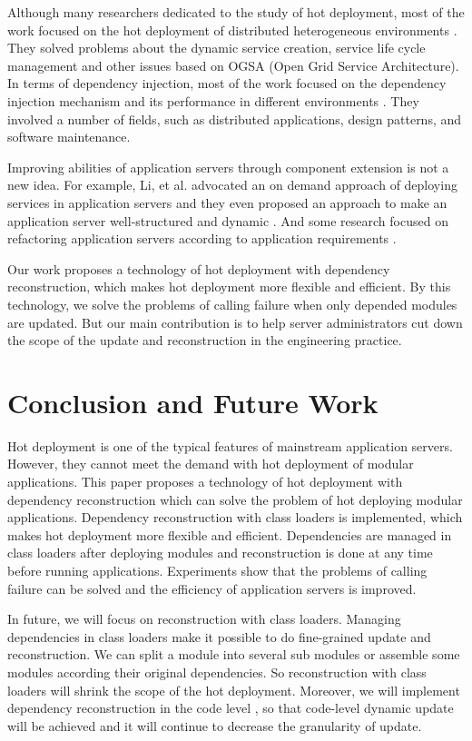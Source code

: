 \documentclass[conference]{IEEEtran}
\begin{document}
Although many researchers dedicated to the study of hot deployment, most of the work focused on the hot deployment of distributed heterogeneous environments \cite{related_hot_2, related_hot_3, related_hot_4}.
They solved problems about the dynamic service creation, service life cycle management and other issues based on OGSA (Open Grid Service Architecture).
In terms of dependency injection, most of the work focused on the dependency injection mechanism and its performance in different environments \cite{related_DI_1, related_DI_2}.
They involved a number of fields, such as distributed applications, design patterns, and software maintenance.

Improving abilities of application servers through component extension is not a new idea.
For example, Li, et al. advocated an on demand approach of deploying services in application servers \cite{related_AS_1} and they even proposed an approach to make an application server well-structured and dynamic \cite{related_AS_2}.
And some research focused on refactoring application servers according to application requirements \cite{related_AS_3}.

Our work proposes a technology of hot deployment with dependency reconstruction, which makes hot deployment more flexible and efficient.
By this technology, we solve the problems of calling failure when only depended modules are updated. 
But our main contribution is to help server administrators cut down the scope of the update and reconstruction in the engineering practice.


\section{Conclusion and Future Work\label{sec:conclusion}}
Hot deployment is one of the typical features of mainstream application servers.
However, they cannot meet the demand with hot deployment of modular applications.
This paper proposes a technology of hot deployment with dependency reconstruction which can solve the problem of hot deploying modular applications.
Dependency reconstruction with class loaders is implemented, which makes hot deployment more flexible and efficient.
Dependencies are managed in class loaders after deploying modules and reconstruction is done at any time before running applications. 
Experiments show that the problems of calling failure can be solved and the efficiency of application servers is improved.

In future, we will focus on reconstruction with class loaders.
Managing dependencies in class loaders make it possible to do fine-grained update and reconstruction.
We can split a module into several sub modules \cite{related_split} or assemble some modules \cite{related_merge} according their original dependencies.
So reconstruction with class loaders will shrink the scope of the hot deployment.
Moreover, we will implement dependency reconstruction in the code level \cite{future_Gu}, so that code-level dynamic update will be achieved and it will continue to decrease the granularity of update.
\end{document}

